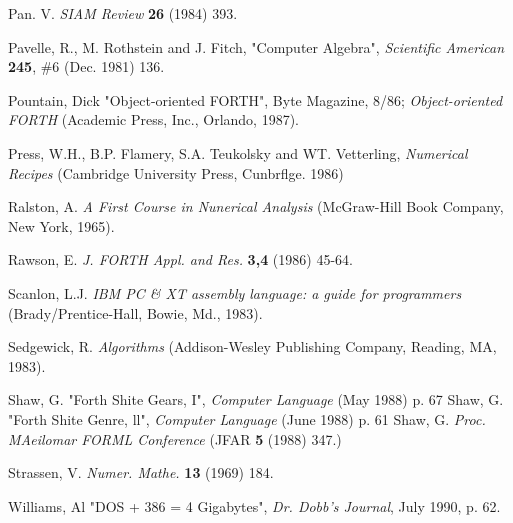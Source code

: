 Pan. V. \textit{SIAM Review} \textbf{26} (1984) 393.

Pavelle, R., M. Rothstein and J. Fitch, "Computer Algebra", \textit{Scientific American} \textbf{245}, \#6 (Dec. 1981) 136.

Pountain, Dick "Object-oriented FORTH", Byte Magazine, 8/86; \textit{Object-oriented FORTH} (Academic Press,
Inc., Orlando, 1987).

Press, W.H., B.P. Flamery, S.A. Teukolsky and WT. Vetterling, \textit{Numerical Recipes} (Cambridge University Press, Cunbrﬂge. 1986)

Ralston, A. \textit{A First Course in Nunerical Analysis} (McGraw-Hill Book Company, New York, 1965).

Rawson, E. \textit{J. FORTH Appl. and Res.} \textbf{3,4} (1986) 45-64.

Scanlon, L.J. \textit{IBM PC \& XT assembly language: a guide for programmers} (Brady/Prentice-Hall, Bowie, Md., 1983).

Sedgewick, R. \textit{Algorithms} (Addison-Wesley Publishing Company, Reading, MA, 1983).

Shaw, G. "Forth Shite Gears, I", \textit{Computer Language} (May 1988) p. 67
Shaw, G. "Forth Shite Genre, ll", \textit{Computer Language} (June 1988) p. 61
Shaw, G. \textit{Proc. MAeilomar FORML Conference} (JFAR \textbf{5} (1988) 347.)

Strassen, V. \textit{Numer. Mathe.} \textbf{13} (1969) 184.

Williams, Al "DOS + 386 = 4 Gigabytes", \textit{Dr. Dobb's Journal}, July 1990, p. 62.